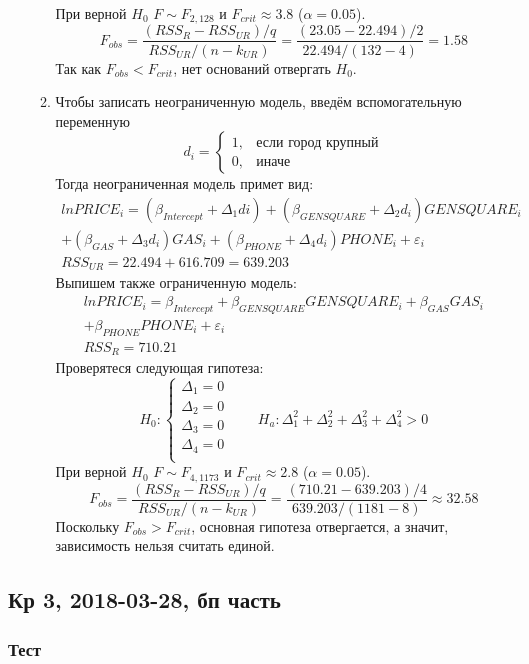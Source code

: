 \begin{enumerate}
\begin{enumerate}
При верной $H_0$ $F \sim F_{2, 128}$ и $F_{crit} \approx 3.8$ ($\alpha = 0.05$).
\[
F_{obs} = \frac{(RSS_R - RSS_{UR}) / q}{RSS_{UR}/(n - k_{UR})} = \frac{(23.05 - 22.494) / 2}{22.494 / (132 - 4)} = 1.58
\]
Так как $F_{obs} < F_{crit}$, нет оснований отвергать $H_0$.
\item Чтобы записать неограниченную модель, введём вспомогательную переменную
\[
d_i = \begin{cases}
1, & \text{если город крупный} \\
0, & \text{иначе}
\end{cases}
\]
Тогда неограниченная модель примет вид:
\begin{multline*}
lnPRICE_i = (\beta_{Intercept} + \Delta_1 di) + (\beta_{GENSQUARE} + \Delta_2 d_i) GENSQUARE_i \\
+ (\beta_{GAS} + \Delta_3 d_i) GAS_i + (\beta_{PHONE} + \Delta_4 d_i) PHONE_i + \varepsilon_i \\
RSS_{UR} = 22.494 + 616.709 = 639.203
\end{multline*}
Выпишем также ограниченную модель:
\begin{multline*}
lnPRICE_i = \beta_{Intercept} + \beta_{GENSQUARE} GENSQUARE_i + \beta_{GAS} GAS_i \\
+ \beta_{PHONE} PHONE_i + \varepsilon_i \\
RSS_{R} = 710.21
\end{multline*}
Проверятеся следующая гипотеза:
\[H_0:
\begin{cases}
  \Delta_1 = 0 \\
  \Delta_2 = 0 \\
  \Delta_3 = 0 \\
  \Delta_4 = 0 \\
\end{cases}
\qquad
H_a: \Delta_1^2 + \Delta_2^2 + \Delta_3^2+ \Delta_4^2 > 0
\]
При верной $H_0$ $F \sim F_{4, 1173}$ и $F_{crit} \approx 2.8$ ($\alpha = 0.05$).
\[
F_{obs} = \frac{(RSS_R - RSS_{UR}) / q}{RSS_{UR}/(n - k_{UR})} = \frac{(710.21 - 639.203)/4}{639.203/(1181-8)} \approx 32.58
\]
Поскольку $F_{obs} > F_{crit}$, основная гипотеза отвергается,
а значит, зависимость нельзя считать единой.
\end{enumerate}
\end{enumerate}

\subsection{Кр 3, 2018-03-28, бп часть}

\subsubsection{Тест}

